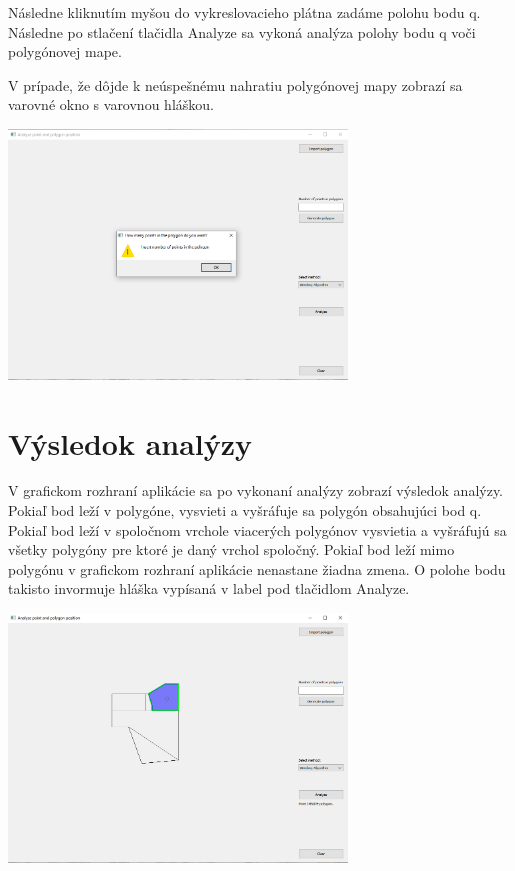 \documentclass[12pt]{article}
\begin{document}
Následne kliknutím myšou do vykreslovacieho plátna zadáme polohu bodu q. Následne po stlačení tlačidla Analyze sa vykoná analýza polohy bodu q voči polygónovej mape.  

V prípade, že dôjde k neúspešnému nahratiu polygónovej mapy zobrazí sa varovné okno s varovnou hláškou.

\begin{center}
   \includegraphics[width=9cm]{./img/warning.png}
\end{center}

\section{Výsledok analýzy}
V grafickom rozhraní aplikácie sa po vykonaní analýzy zobrazí výsledok analýzy. Pokiaľ bod leží v polygóne, vysvieti a vyšráfuje sa polygón obsahujúci bod q. Pokiaľ bod leží v spoločnom vrchole viacerých polygónov vysvietia a vyšráfujú sa všetky polygóny pre ktoré je daný vrchol spoločný. Pokiaľ bod leží mimo polygónu v grafickom rozhraní aplikácie nenastane žiadna zmena. O polohe bodu takisto invormuje hláška vypísaná v label pod tlačidlom Analyze.

\begin{center}
   \includegraphics[width=9cm]{./img/bod_v_polygone.png}
\end{center}
\end{document}
